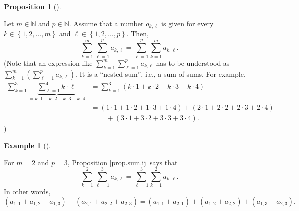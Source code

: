 \documentclass[numbers=enddot,12pt,final,onecolumn,notitlepage]{scrartcl}%
\theoremstyle{definition}
\newtheorem{prop}[theo]{Proposition}
\newenvironment{proposition}[1][]
{\begin{prop}[#1]\begin{leftbar}}
{\end{leftbar}\end{prop}}
\newtheorem{exam}[theo]{Example}
\newenvironment{example}[1][]
{\begin{exam}[#1]\begin{leftbar}}
{\end{leftbar}\end{exam}}
\let\sumnonlimits\sum
\renewcommand{\sum}{\sumnonlimits\limits}
\begin{document}
\begin{proposition}
\label{prop.sum.ij}Let $m\in\mathbb{N}$ and $p\in\mathbb{N}$. Assume that a
number $a_{k,\ell}$ is given for every $k\in\left\{  1,2,\ldots,m\right\}  $
and $\ell\in\left\{  1,2,\ldots,p\right\}  $. Then,%
\[
\sum_{k=1}^{m}\sum_{\ell=1}^{p}a_{k,\ell}=\sum_{\ell=1}^{p}\sum_{k=1}%
^{m}a_{k,\ell}.
\]
(Note that an expression like $\sum_{k=1}^{m}\sum_{\ell=1}^{p}a_{k,\ell}$ has
to be understood as $\sum_{k=1}^{m}\left(  \sum_{\ell=1}^{p}a_{k,\ell}\right)
$. It is a \textquotedblleft nested sum\textquotedblright, i.e., a sum of
sums. For example,%
\begin{align*}
\sum_{k=1}^{3}\underbrace{\sum_{\ell=1}^{4}k\cdot\ell}_{=k\cdot1+k\cdot
2+k\cdot3+k\cdot4}  &  =\sum_{k=1}^{3}\left(  k\cdot1+k\cdot2+k\cdot
3+k\cdot4\right) \\
&  =\left(  1\cdot1+1\cdot2+1\cdot3+1\cdot4\right)  +\left(  2\cdot
1+2\cdot2+2\cdot3+2\cdot4\right) \\
&  \ \ \ \ \ \ \ \ \ \ +\left(  3\cdot1+3\cdot2+3\cdot3+3\cdot4\right)  .
\end{align*}
)
\end{proposition}

\begin{example}
For $m=2$ and $p=3$, Proposition \ref{prop.sum.ij} says that%
\[
\sum_{k=1}^{2}\sum_{\ell=1}^{3}a_{k,\ell}=\sum_{\ell=1}^{3}\sum_{k=1}%
^{2}a_{k,\ell}.
\]
In other words,%
\[
\left(  a_{1,1}+a_{1,2}+a_{1,3}\right)  +\left(  a_{2,1}+a_{2,2}%
+a_{2,3}\right)  =\left(  a_{1,1}+a_{2,1}\right)  +\left(  a_{1,2}%
+a_{2,2}\right)  +\left(  a_{1,3}+a_{2,3}\right)  .
\]

\end{example}
\end{document}
